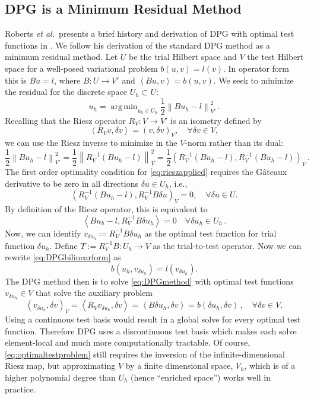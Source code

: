 \documentclass[letterpaper]{article}
\DeclareMathOperator*{\argmin}{\arg\,\min}
\newcommand{\eqnref}[1]{\eqref{eq:#1}}
\newcommand{\norm}[1]{\left\| #1 \right\|}
\newcommand{\LRp}[1]{\left( #1 \right)}
\newcommand{\LRa}[1]{\left\langle #1 \right\rangle}
\def\etal{{\it et al.~}}
\begin{document}
\subsection{DPG is a Minimum Residual Method}
Roberts \etal presents a brief history and derivation of DPG with optimal test functions in
\cite{DPGStokes}. We follow his derivation of the standard DPG method as a
minimum residual method. Let $U$ be the trial Hilbert space and $V$ the test
Hilbert space for a well-posed variational problem $b(u,v)=l(v)$. In operator
form this is $Bu=l$, where $B:U\rightarrow V'$ and $\LRa{Bu,v}=b(u,v)$. We seek to minimize the
residual for the discrete space $U_h\subset U$:
\begin{equation}
u_h=\argmin_{u_h\in U_h}\frac{1}{2}\norm{Bu_h-l}^2_{V'}\,.
\label{minresidual}
\end{equation}
Recalling that the Riesz operator $R_V:V\rightarrow V'$ is an isometry defined
by
\[
\LRa{R_Vv,\delta v}=\LRp{v,\delta v}_V,\quad\forall\delta v\in V,
\]
we can use the Riesz inverse to minimize in the $V$-norm rather than its dual:
\begin{equation}
\frac{1}{2}\norm{Bu_h-l}^2_{V'}=\frac{1}{2}\norm{R_V^{-1}(Bu_h-l)}^2_V
=\frac{1}{2}\LRp{R_V^{-1}(Bu_h-l),R_V^{-1}(Bu_h-l)}_V\,.
\label{eq:rieszapplied}
\end{equation}
The first order optimality condition for \eqnref{rieszapplied} requires
the G\^ateaux derivative to be zero in all directions $\delta u \in
U_h$, i.e.,
\[
\left(R_V^{-1}(Bu_h-l),R_V^{-1}B\delta u\right)_V = 0, \quad \forall \delta u \in U.
\]
By definition of the Riesz operator, this is equivalent to
\begin{equation}
\LRa{Bu_h-l,R_V^{-1}B\delta u_h}=0\quad\forall\delta u_h\in U_h\,.
\label{eq:DPGbilinearform}
\end{equation}
Now, we can identify $v_{\delta u_h}\coloneqq R_V^{-1}B\delta u_h$ as the
optimal test function for trial function $\delta u_h$. Define $T:=R_V^{-1}B:U_h\rightarrow V$ as the trial-to-test operator. Now we can rewrite
\eqnref{DPGbilinearform} as
\begin{equation}
b(u_h,v_{\delta u_h})=l(v_{\delta u_h}).
\label{eq:DPGmethod}
\end{equation}
The DPG method then is to solve \eqnref{DPGmethod} with optimal test functions
$v_{\delta u_h}\in V$ that solve the auxiliary problem
\begin{equation}
\LRp{v_{\delta u_h},\delta v}_V=\LRa{R_Vv_{\delta u_h},\delta v}
=\LRa{B\delta u_h,\delta v}=b(\delta u_h,\delta v)\,,\quad\forall\delta v\in V.
\label{eq:optimaltestproblem}
\end{equation}
Using a continuous test basis would result in a global solve for every optimal
test function. Therefore DPG uses a discontinuous test basis which makes each
solve element-local and much more computationally tractable. Of course,
\eqnref{optimaltestproblem} still requires the inversion of the
infinite-dimensional Riesz map, but approximating $V$ by a finite
dimensional space, $V_h$, which is of a higher polynomial degree than $U_h$ (hence
``enriched space'') works well in practice.
\end{document}
